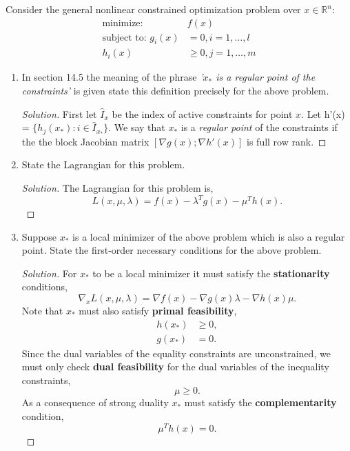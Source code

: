 \documentclass[12pt]{article}
\makeatletter
\theoremstyle{homework}
\newenvironment{exercise}[1]
{\def\@currentlabel{#1}\exercisecore}
{\endexercisecore}
\newcommand{\Reals}{\ensuremath{\mathbb R}}
\let\RR\Reals
\makeatother
\begin{document}
\begin{exercise}{P24} Consider the general nonlinear constrained optimization problem over $x \in \RR^n$:
  \begin{align*}
    \text{minimize: } &f(x)\\
    \text{subject to: } g_i(x) &= 0, i = 1, \dots, l\\
    h_i(x) &\geq 0, j = 1, \dots, m
  \end{align*} 

  \begin{enumerate}
    \item[(a)] In section 14.5 the meaning of the phrase \emph{'$x_*$ is a regular point of the constraints'} is given
    state this definition precisely for the above problem. 
    \begin{proof}[Solution] First let $\hat{I}_x$ be the index of active constraints for point $x$. Let h'(x) = $\{h_j(x_*): i \in \hat{I}_{x_*}\}$.
      We say that $x_*$ is a \emph{regular point} of the constraints if the the block Jacobian matrix $[\nabla g(x); \nabla h'(x)]$ is full row rank.
    \end{proof}
  \vspace{.15in}

  \item[(b)] State the Lagrangian for this problem. 
    \begin{proof}[Solution] The Lagrangian for this problem is, 
      \begin{equation*}
        L(x, \mu, \lambda) = f(x) - \lambda^Tg(x) - \mu^Th(x).
      \end{equation*}
    \end{proof}
  \vspace{.15in}

  \item[(c)] Suppose $x_*$ is a local minimizer of the above problem which is also a regular point. 
  State the first-order necessary conditions for the above problem. 
  \begin{proof}[Solution] For $x_*$ to be a local minimizer it must satisfy the \textbf{stationarity} conditions, 
    \begin{equation*}
      \nabla_x L(x, \mu, \lambda) = \nabla f(x) - \nabla g(x)\lambda - \nabla h(x)\mu.
    \end{equation*} 
    Note that $x_*$ must also satisfy \textbf{primal feasibility},
    \begin{align*}
      h(x_*) &\geq 0,\\
      g(x_*) &= 0.
    \end{align*}
    Since the dual variables of the equality constraints are unconstrained, we must only check \textbf{dual feasibility}
    for the dual variables of the inequality constraints, 
    \begin{equation*}
      \mu \geq 0. 
    \end{equation*}
    As a consequence of strong duality $x_*$ must satisfy the \textbf{complementarity} condition, 
    \begin{equation*}
      \mu^Th(x) = 0.
    \end{equation*}


\end{proof}
\end{enumerate}
\end{exercise}
\end{document}
